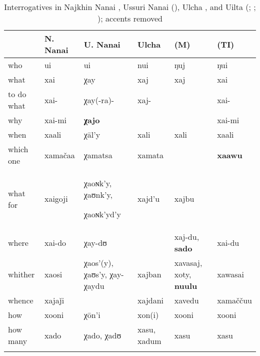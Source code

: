 \begin{table}
\caption{Interrogatives in Najkhin Nanai \citep{Kazama2007}, Ussuri Nanai (\citealt{Sem1976}), Ulcha \citep{Majewicz2011}, and Uilta (\cite{Ikegami1997}; \cite{Tsumagari2009b}; \cite{Majewicz2011}); accents removed}
\label{tab:tungu:27}

\begin{tabularx}{\textwidth}{llQlQl}
\lsptoprule
& \textbf{N. Nanai} & \textbf{U. Nanai} & \textbf{Ulcha} & \textbf{ (M)} & \textbf{ (TI)}\\
\midrule
who & ui & ui & nui & ŋuj & ŋui\\
what & xai & χay & xaj & xaj & xai\\
to do what & xai- & χay(-ra)- & xaj- &  & xai-\\
why & xai-mi & \textbf{χajo} &  &  & xai-mi\\
when & xaali & χ\=al’y & xali & xali & xaali\\
which one & xamačaa & χamatsa & xamata &  & \textbf{xaawu}\\
what for & xaigoji & χaoɴk’y, χaʊnk’y,

χaoɴk’yd’y & xajd’u & xajbu & \\
where & xai-do & χay-dʊ &  & xaj-du, \textbf{sado} & xai-du\\
whither & xaosi & χaos’(y), χaʊs’y, χay-χaydu & xajban & xavasaj, xoty, \textbf{nuulu} & xawasai\\
whence & xajaǰi &  & xajdani & xavedu & xamaččuu\\
how & xooni & χ\=on’i & xon(i) & xooni & xooni\\
how many & xado & χado, χadʊ & xasu, xadum & xasu & xasu\\
\lspbottomrule
\end{tabularx}
\end{table}

